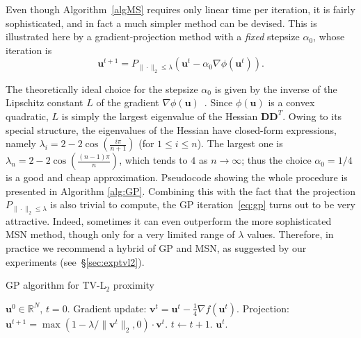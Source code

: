 \documentclass[twoside,11pt]{article}
\newcommand{\vu}{\bm{u}}       \newcommand{\vuh}{\hat{\bm{u}}}        \newcommand{\uh}{\hat{u}}    \newcommand{\vut}{\tilde{\bm{u}}}       \newcommand{\ut}{\tilde{u}}
\newcommand{\vv}{\bm{v}}       \newcommand{\vvh}{\hat{\bm{v}}}        \newcommand{\vh}{\hat{v}}    \newcommand{\vvt}{\tilde{\bm{v}}}       \newcommand{\vtild}{\tilde{v}}
\newcommand{\md}{\bm{D}}
\newcommand{\mynorm}[2]{\| {#1} \|_{#2}}
\newcommand{\enorm}[1]{\mynorm{#1}{2}}
\numberwithin{equation}{section}
\numberwithin{theorem}{section}
\begin{document}
Even though Algorithm~\ref{algMS} requires only linear time per iteration, it is fairly sophisticated, and in fact a much simpler method can be devised. This is illustrated here by a gradient-projection method with a \emph{fixed} stepsize $\alpha_0$, whose iteration is
\begin{equation}
  \label{eq:gp}
  \vu^{t+1} = P_{\enorm{\cdot} \le \lambda}(\vu^t - \alpha_0\nabla\phi(\vu^t)).
\end{equation}

The theoretically ideal choice for the stepsize $\alpha_0$ is given by the inverse of the Lipschitz constant $L$ of the gradient $\nabla \phi(\vu)$~\citep{nest07,fista}. Since $\phi(\vu)$ is a convex quadratic, $L$ is simply the largest eigenvalue of the Hessian $\md \md^T$. Owing to its special structure, the eigenvalues of the Hessian have closed-form expressions, namely $\lambda_i = 2 - 2 \cos \left(\frac{i \pi}{n+1}\right)$ (for $1\le i \le n$). The largest one is $\lambda_{n} = 2 - 2 \cos \left(\frac{(n-1) \pi}{n}\right)$, which tends to $4$ as $n \to \infty$; thus the choice $\alpha_0 = 1/4$ is a good and cheap approximation. Pseudocode showing the whole procedure is presented in Algorithm \ref{alg:GP}. Combining this with the fact that the projection $P_{\enorm{\cdot} \le \lambda}$ is also trivial to compute, the GP iteration~\eqref{eq:gp} turns out to be very attractive. Indeed, sometimes it can even outperform the more sophisticated MSN method, though only for a very limited range of $\lambda$ values.
Therefore, in practice we recommend a hybrid of GP and MSN, as suggested by our experiments (see~\S\ref{sec:exptvl2}).

\begin{algorithm}[tbp]
 \caption{GP algorithm for TV-L$_2$ proximity}
 \label{alg:GP}
 \begin{algorithmic}
   $\vu^0 \in {\mathbb R}^N$, $t=0$.
   \State Gradient update: $\vv^t = \vu^t - \frac{1}{4} \nabla f(\vu^t)$.
   \State Projection: $\vu^{t+1} = \max(1-\lambda/\enorm{\vv^t}, 0)\cdot \vv^t$.
   \State $t \gets t + 1$.
  \EndWhile
   \State\Return $\vu^t$.
 \end{algorithmic}
\end{algorithm}
\end{document}
